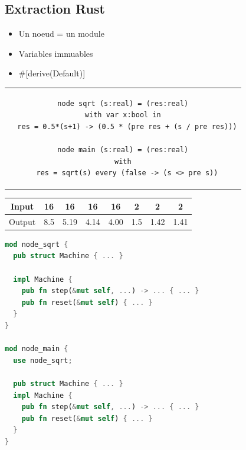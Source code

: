 \documentclass[11pt,usenames,dvipsnames]{beamer}
\newcommand{\inline}[1]{{\ttfamily #1}}
\begin{document}
\subsection{Extraction Rust}

\begin{frame}[fragile]{\null}
  \begin{itemize}
  \item<1-> Un noeud = un module
  \item<2-> Variables immuables 
  \item<4-> \inline{\#[derive(Default)]}
  \end{itemize}
\end{frame}

\begin{frame}[fragile]{\null}
  \begin{tabular}{c}
    \begin{lstlisting}[language=minils]
node sqrt (s:real) = (res:real)
with var x:bool in
  res = 0.5*(s+1) -> (0.5 * (pre res + (s / pre res)))

node main (s:real) = (res:real)
with
  res = sqrt(s) every (false -> (s <> pre s))
\end{lstlisting}
  \end{tabular}

  \begin{center}
    \begin{tabular}{|c|ccccccc|}
      \hline
      Input  & 16   & 16   & 16   & 16   & 2   & 2    & 2   \\
      \hline
      Output & 8.5  & 5.19 & 4.14 & 4.00 & 1.5 & 1.42 & 1.41 \\
      \hline
    \end{tabular}
  \end{center}
\end{frame}

\begin{frame}[fragile]{\null}
  \begin{lstlisting}[language=Rust]
mod node_sqrt {
  pub struct Machine { ... }

  impl Machine {
    pub fn step(&mut self, ...) -> ... { ... }
    pub fn reset(&mut self) { ... }
  }
}

mod node_main {
  use node_sqrt;

  pub struct Machine { ... }
  impl Machine {
    pub fn step(&mut self, ...) -> ... { ... }
    pub fn reset(&mut self) { ... }
  }
}
  \end{lstlisting}
\end{frame}
\end{document}
